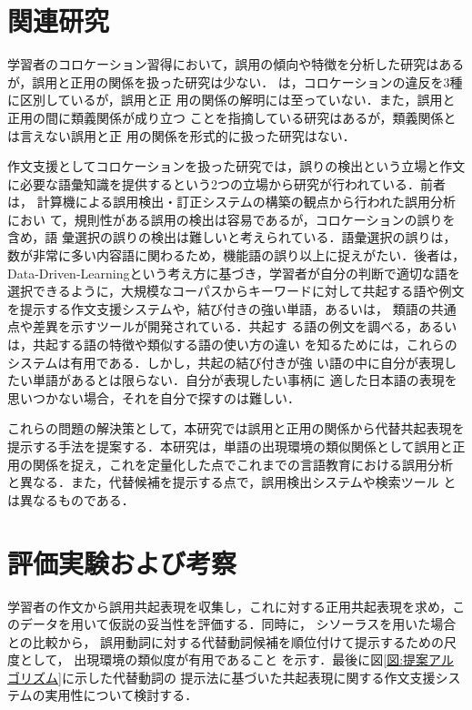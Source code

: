 \documentclass[japanese]{jnlp_1.4}
\begin{document}
\section{関連研究}

学習者のコロケーション習得において，誤用の傾向や特徴を分析した研究はある
が\cite{曹,滝沢,小森}，誤用と正用の関係を扱った研究は少ない．
\cite{James}は，コロケーションの違反を3種に区別しているが，誤用と正
用の関係の解明には至っていない．また，誤用と正用の間に類義関係が成り立つ
ことを指摘している研究はあるが\cite{鈴木}，類義関係とは言えない誤用と正
用の関係を形式的に扱った研究はない．

作文支援としてコロケーションを扱った研究では，誤りの検出という立場と作文
に必要な語彙知識を提供するという2つの立場から研究が行われている．前者は，
計算機による誤用検出・訂正システムの構築の観点から行われた誤用分析におい
て，規則性がある誤用の検出は容易であるが，コロケーションの誤りを含め，語
彙選択の誤りの検出は難しいと考えられている\cite{白井}．語彙選択の誤りは，
数が非常に多い内容語に関わるため，機能語の誤り以上に捉えがたい．後者は，
Data-Driven-Learningという考え方に基づき，学習者が自分の判断で適切な語を
選択できるように，大規模なコーパスからキーワードに対して共起する語や例文
を提示する作文支援システム\cite{Nishina}や，結び付きの強い単語，あるいは，
類語の共通点や差異を示すツール\cite{Kilgariff}が開発されている．共起す
る語の例文を調べる，あるいは，共起する語の特徴や類似する語の使い方の違い
を知るためには，これらのシステムは有用である．しかし，共起の結び付きが強
い語の中に自分が表現したい単語があるとは限らない．自分が表現したい事柄に
適した日本語の表現を思いつかない場合，それを自分で探すのは難しい．

これらの問題の解決策として，本研究では誤用と正用の関係から代替共起表現を
提示する手法を提案する．本研究は，単語の出現環境の類似関係として誤用と正
用の関係を捉え，これを定量化した点でこれまでの言語教育における誤用分析
と異なる．また，代替候補を提示する点で，誤用検出システムや検索ツール
とは異なるものである．



\section{評価実験および考察}
\label{実験および考察}

学習者の作文から誤用共起表現を収集し，これに対する正用共起表現を求め，こ
のデータを用いて仮説の妥当性を評価する．同時に，
シソーラスを用いた場合との比較から，
誤用動詞に対する代替動詞候補を順位付けて提示するための尺度として，
出現環境の類似度が有用であること
を示す．最後に図\ref{図:提案アルゴリズム}に示した代替動詞の
提示法に基づいた共起表現に関する作文支援システムの実用性について検討する．
\end{document}
